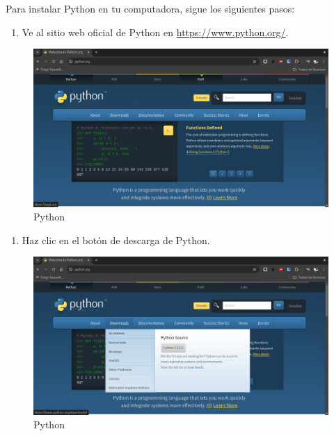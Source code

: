\documentclass[
  a4paper,
  DIV=11,
  numbers=noendperiod,
  onepage,
  openany]{scrreprt}
\providecommand{\tightlist}{%
  \setlength{\itemsep}{0pt}\setlength{\parskip}{0pt}}\usepackage{longtable,booktabs,array}
\begin{document}
Para instalar Python en tu computadora, sigue los siguientes pasos:

\begin{enumerate}
\def\labelenumi{\arabic{enumi}.}
\tightlist
\item
  Ve al sitio web oficial de Python en \url{https://www.python.org/}.
\end{enumerate}

\begin{figure}[H]

{\centering \includegraphics{unidades/unidad1/images/python.org.png}

}

\caption{Python}

\end{figure}%

\begin{enumerate}
\def\labelenumi{\arabic{enumi}.}
\setcounter{enumi}{1}
\tightlist
\item
  Haz clic en el botón de descarga de Python.
\end{enumerate}

\begin{figure}[H]

{\centering \includegraphics{unidades/unidad1/images/download.png}

}

\caption{Python}

\end{figure}%
\end{document}
